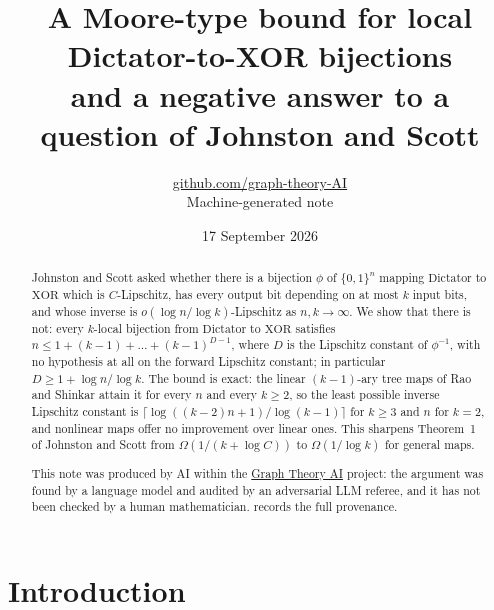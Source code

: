 \documentclass[11pt,a4paper]{article}
\title{A Moore-type bound for local Dictator-to-XOR bijections\\ and a negative answer to a question of Johnston and Scott}
\author{\href{https://github.com/graph-theory-AI}{github.com/graph-theory-AI}\\[2pt] \normalsize Machine-generated note}
\date{17 September 2026}
\theoremstyle{plain}
\theoremstyle{definition}
\theoremstyle{remark}
\newcommand{\Dict}{\mathrm{Dictator}}
\newcommand{\XOR}{\mathrm{XOR}}
\begin{document}
\maketitle

\begin{abstract}
Johnston and Scott asked whether there is a bijection $\phi$ of $\{0,1\}^n$ mapping $\Dict$ to $\XOR$ which is $C$-Lipschitz, has every output bit depending on at most $k$ input bits, and whose inverse is $o(\log n/\log k)$-Lipschitz as $n,k\to\infty$. We show that there is not: every $k$-local bijection from $\Dict$ to $\XOR$ satisfies $n\le 1+(k-1)+\dots+(k-1)^{D-1}$, where $D$ is the Lipschitz constant of $\phi^{-1}$, with no hypothesis at all on the forward Lipschitz constant; in particular $D\ge 1+\log n/\log k$. The bound is exact: the linear $(k-1)$-ary tree maps of Rao and Shinkar attain it for every $n$ and every $k\ge2$, so the least possible inverse Lipschitz constant is $\lceil\log((k-2)n+1)/\log(k-1)\rceil$ for $k\ge3$ and $n$ for $k=2$, and nonlinear maps offer no improvement over linear ones. This sharpens Theorem~1 of Johnston and Scott from $\Omega(1/(k+\log C))$ to $\Omega(1/\log k)$ for general maps.

\medskip\noindent\small
This note was produced by AI within the \href{https://github.com/graph-theory-AI/Graph-Theory-LLM-Proofs}{Graph Theory AI} project:
the argument was found by a language model and audited by an adversarial LLM
referee, and it has not been checked by a human mathematician.
 records the full provenance.
\end{abstract}

\section{Introduction}
\end{document}
